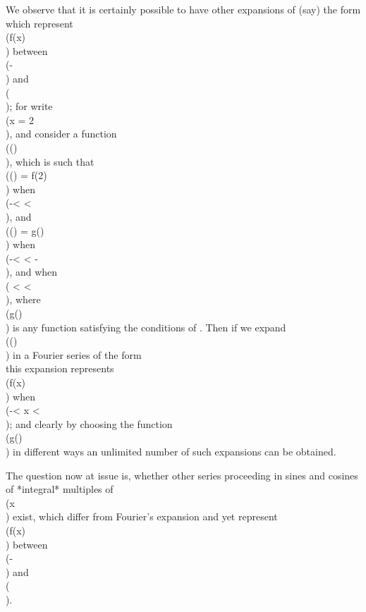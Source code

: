 We observe that it is certainly possible to have other expansions of
(say) the form
\\[ 
\alpha_{0}
+
\sum_{m=1}^{\infty} \left(
  \alpha_{m} \cos \frac{1}{2} mx
  +
  \beta_{m} \sin \frac{1}{2} mx
\right),
\\] 
which represent \\(f(x)\\) between \\(-\pi\\) and \\(\pi\\); for write
\\(x = 2\xi\\), and
consider a function \\(\phi(\xi)\\), which is such that
\\(\phi(\xi) = f(2\xi)\\) when \\(-\pi < \xi < \pi\\), and
\\(\phi(\xi) = g(\xi)\\) when \\(-\pi < \xi < - \pi\\), and when
\\( \pi < \xi < \pi\\),
where \\(g(\xi)\\) is any function satisfying the conditions of
. Then if we expand
\\(\phi(\xi)\\) in a Fourier series of the form
\\[ 
\alpha_{0}
+
\sum_{m=1}^{\infty} \left(
  \alpha_{m} \cos m \xi
  +
  \beta_{m} \sin m \xi
\right),
\\] 
this expansion represents \\(f(x)\\) when \\(-\pi < x < \pi\\); and clearly by
choosing the function \\(g(\xi)\\) in different ways an unlimited number of
such expansions can be obtained.

The question now at issue is, whether other series proceeding in
sines and cosines of *integral* multiples of \\(x\\) exist, which differ from
Fourier's expansion and yet represent \\(f(x)\\) between \\(-\pi\\) and \\(\pi\\).

